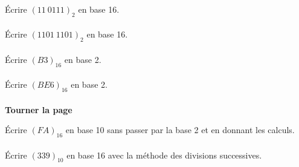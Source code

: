 \documentclass[a4paper,12pt,eval,firamath]{nsi}
\begin{document}
\maketitle

\'Ecrire $(11\ 0111)_2$ en base 16.\\

\\

\'Ecrire $(1101\ 1101)_2$ en base 16.\\

\\

\'Ecrire $(B3)_{16}$ en base 2.\\

\\

\'Ecrire $(BE6)_{16}$ en base 2.\\

\\

{\hfill\textbf{Tourner la page}}

\newpage

\'Ecrire $(FA)_{16}$ en base 10 sans passer par la base 2 et en donnant les calculs.\\

\\

\'Ecrire $(339)_{10}$ en base 16 avec la méthode des divisions successives.\\

\end{document}
